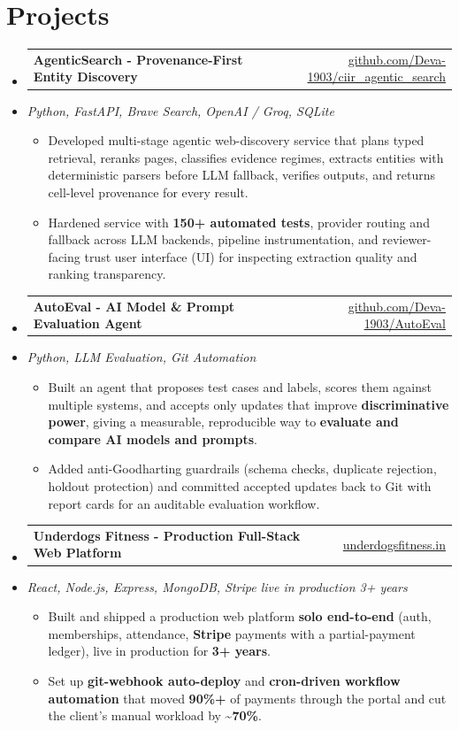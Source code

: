 \documentclass[letterpaper,10pt]{article}
\makeatletter
\newcommand{\resumeItem}[1]{
  \item\small{#1\vspace{-1pt}}
}
\newcommand{\resumeProjectHeading}[2]{
    \item
    \begin{tabular*}{0.985\textwidth}[t]{l@{\extracolsep{\fill}}r}
      \small\textbf{#1} & \small #2 \\
    \end{tabular*}\vspace{-5pt}
}
\newcommand{\resumeProjectSubheading}[1]{
  \vspace{-2pt}\item[] {\small\textcolor{ResumeSlate}{\emph{#1}}}\vspace{-3pt}
}
\newcommand{\resumeSubHeadingListStart}{\begin{itemize}[leftmargin=0.0in, label={}, itemsep=2pt, topsep=2pt]}
\newcommand{\resumeSubHeadingListEnd}{\end{itemize}}
\newcommand{\resumeItemListStart}{\begin{itemize}[leftmargin=0.18in, itemsep=2pt, topsep=1pt]}
\newcommand{\resumeItemListEnd}{\end{itemize}\vspace{-4pt}}
\makeatother
\begin{document}
\section{Projects}
\resumeSubHeadingListStart
  \resumeProjectHeading
    {AgenticSearch - Provenance-First Entity Discovery}
    {\href{https://github.com/Deva-1903/ciir_agentic_search}{github.com/Deva-1903/ciir\_agentic\_search}}
  \resumeProjectSubheading{Python, FastAPI, Brave Search, OpenAI / Groq, SQLite}
    \resumeItemListStart
      \resumeItem{Developed multi-stage agentic web-discovery service that plans typed retrieval, reranks pages, classifies evidence regimes, extracts entities with deterministic parsers before LLM fallback, verifies outputs, and returns cell-level provenance for every result.}
      \resumeItem{Hardened service with \textbf{150+ automated tests}, provider routing and fallback across LLM backends, pipeline instrumentation, and reviewer-facing trust user interface (UI) for inspecting extraction quality and ranking transparency.}
    \resumeItemListEnd
  \resumeProjectHeading
    {AutoEval - AI Model \& Prompt Evaluation Agent}
    {\href{https://github.com/Deva-1903/AutoEval}{github.com/Deva-1903/AutoEval}}
  \resumeProjectSubheading{Python, LLM Evaluation, Git Automation}
    \resumeItemListStart
      \resumeItem{Built an agent that proposes test cases and labels, scores them against multiple systems, and accepts only updates that improve \textbf{discriminative power}, giving a measurable, reproducible way to \textbf{evaluate and compare AI models and prompts}.}
      \resumeItem{Added anti-Goodharting guardrails (schema checks, duplicate rejection, holdout protection) and committed accepted updates back to Git with report cards for an auditable evaluation workflow.}
    \resumeItemListEnd
  \resumeProjectHeading
    {Underdogs Fitness - Production Full-Stack Web Platform}
    {\href{https://www.underdogsfitness.in}{underdogsfitness.in}}
  \resumeProjectSubheading{React, Node.js, Express, MongoDB, Stripe \enspace\textbar\enspace live in production 3+ years}
    \resumeItemListStart
      \resumeItem{Built and shipped a production web platform \textbf{solo end-to-end} (auth, memberships, attendance, \textbf{Stripe} payments with a partial-payment ledger), live in production for \textbf{3+ years}.}
      \resumeItem{Set up \textbf{git-webhook auto-deploy} and \textbf{cron-driven workflow automation} that moved \textbf{90\%+} of payments through the portal and cut the client's manual workload by \textbf{\textasciitilde70\%}.}
    \resumeItemListEnd
\resumeSubHeadingListEnd
\vspace{-4pt}
\end{document}
